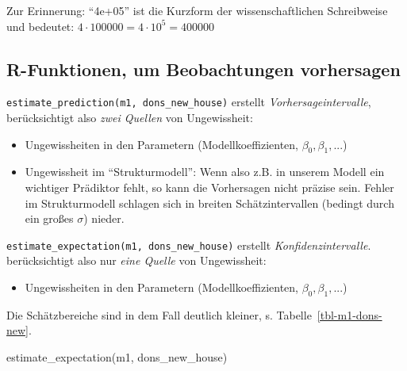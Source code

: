 \documentclass[
  a4paper,
  DIV=11]{scrreprt}
\newenvironment{Shaded}{\begin{snugshade}}{\end{snugshade}}
\newcommand{\FunctionTok}[1]{\textcolor[rgb]{0.28,0.35,0.67}{#1}}
\newcommand{\NormalTok}[1]{\textcolor[rgb]{0.00,0.23,0.31}{#1}}
\providecommand{\tightlist}{%
  \setlength{\itemsep}{0pt}\setlength{\parskip}{0pt}}\usepackage{longtable,booktabs,array}
\theoremstyle{definition}
\theoremstyle{remark}
\begin{document}
\begin{tcolorbox}[enhanced jigsaw, leftrule=.75mm, left=2mm, bottomrule=.15mm, opacityback=0, coltitle=black, colbacktitle=quarto-callout-note-color!10!white, opacitybacktitle=0.6, rightrule=.15mm, toptitle=1mm, colback=white, colframe=quarto-callout-note-color-frame, arc=.35mm, toprule=.15mm, breakable, titlerule=0mm, bottomtitle=1mm, title=\textcolor{quarto-callout-note-color}{\faInfo}\hspace{0.5em}{Hinweis}]
Zur Erinnerung: ``4e+05'' ist die Kurzform der wissenschaftlichen
Schreibweise und bedeutet: \(4 \cdot 100000 = 4\cdot10^5 = 400000\)
\end{tcolorbox}

\hypertarget{r-funktionen-um-beobachtungen-vorhersagen}{%
\subsection{R-Funktionen, um Beobachtungen
vorhersagen}\label{r-funktionen-um-beobachtungen-vorhersagen}}

\texttt{estimate\_prediction(m1,\ dons\_new\_house)} erstellt
\emph{Vorhersageintervalle}, berücksichtigt also \emph{zwei Quellen} von
Ungewissheit:

\begin{itemize}
\tightlist
\item
  Ungewissheiten in den Parametern (Modellkoeffizienten,
  \(\beta_0, \beta_1, ...\))
\item
  Ungewissheit im ``Strukturmodell'': Wenn also z.B. in unserem Modell
  ein wichtiger Prädiktor fehlt, so kann die Vorhersagen nicht präzise
  sein. Fehler im Strukturmodell schlagen sich in breiten
  Schätzintervallen (bedingt durch ein großes \(\sigma\)) nieder.
\end{itemize}

\texttt{estimate\_expectation(m1,\ dons\_new\_house)} erstellt
\emph{Konfidenzintervalle}. berücksichtigt also nur \emph{eine Quelle}
von Ungewissheit:

\begin{itemize}
\tightlist
\item
  Ungewissheiten in den Parametern (Modellkoeffizienten,
  \(\beta_0, \beta_1, ...\))
\end{itemize}

Die Schätzbereiche sind in dem Fall deutlich kleiner, s.
Tabelle~\ref{tbl-m1-dons-new}.

\begin{Shaded}
\begin{Highlighting}[]
\FunctionTok{estimate\_expectation}\NormalTok{(m1, dons\_new\_house)}
\end{Highlighting}
\end{Shaded}
\end{document}
